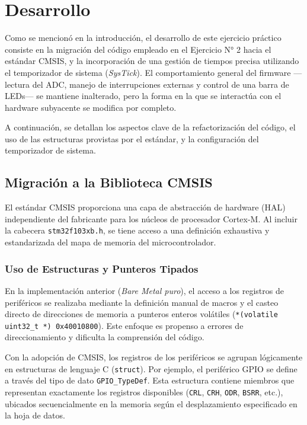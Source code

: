 \chapter{Desarrollo}
\label{ch:desarrollo}

Como se mencionó en la introducción, el desarrollo de este ejercicio práctico consiste en la migración del
código empleado en el Ejercicio N° 2 hacia el estándar CMSIS, y la incorporación de una gestión de tiempos
precisa utilizando el temporizador de sistema (\textit{SysTick}). El comportamiento general del firmware —lectura
del ADC, manejo de interrupciones externas y control de una barra de LEDs— se mantiene inalterado, pero la forma
en la que se interactúa con el hardware subyacente se modifica por completo.

A continuación, se detallan los aspectos clave de la refactorización del código, el uso de las estructuras
provistas por el estándar, y la configuración del temporizador de sistema.

\section{Migración a la Biblioteca CMSIS}
\label{sec.ej3:cmsis}

El estándar CMSIS proporciona una capa de abstracción de hardware (HAL) independiente del fabricante para los
núcleos de procesador Cortex-M. Al incluir la cabecera \lstinline{stm32f103xb.h}, se tiene acceso a una
definición exhaustiva y estandarizada del mapa de memoria del microcontrolador.

\subsection{Uso de Estructuras y Punteros Tipados}

En la implementación anterior (\textit{Bare Metal puro}), el acceso a los registros de periféricos se
realizaba mediante la definición manual de macros y el casteo directo de direcciones de memoria a
punteros enteros volátiles (\lstinline{*(volatile uint32_t *) 0x40010800}). Este enfoque es propenso a
errores de direccionamiento y dificulta la comprensión del código.

Con la adopción de CMSIS, los registros de los periféricos se agrupan lógicamente en estructuras
de lenguaje C (\lstinline{struct}). Por ejemplo, el periférico GPIO se define a través del tipo de
dato \lstinline{GPIO_TypeDef}. Esta estructura contiene miembros que representan exactamente los registros
disponibles (\lstinline{CRL}, \lstinline{CRH}, \lstinline{ODR}, \lstinline{BSRR}, etc.), ubicados
secuencialmente en la memoria según el desplazamiento especificado en la hoja de datos.

